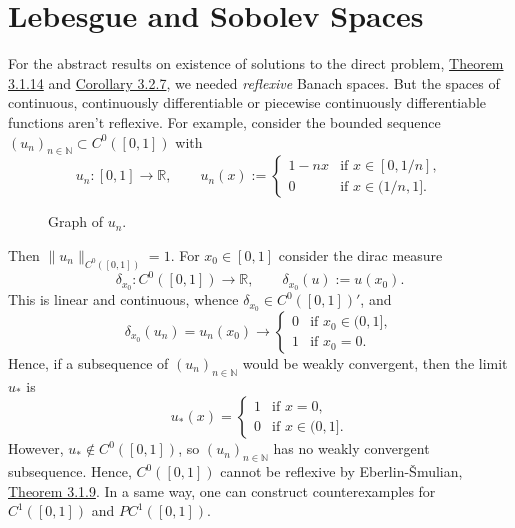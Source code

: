 \section{Lebesgue and Sobolev Spaces}
For the abstract results on existence of solutions to the direct problem, \hyperlink{theorem_3_1_14}{Theorem 3.1.14} and \hyperlink{corollary_3_2_7}{Corollary 3.2.7}, we needed \textit{reflexive} Banach spaces. But the spaces of continuous, continuously differentiable or piecewise continuously differentiable functions aren't reflexive. For example, consider the bounded sequence $(u_n)_{n\in\mathbb{N}}\subset C^0([0,1])$ with
\[u_n:[0,1]\longrightarrow\mathbb{R},\qquad u_n(x):=\left\{\begin{array}{rl}
	1-nx&\text{if }x\in[0,1/n],\\
	0&\text{if }x\in(1/n,1].
\end{array}\right.\]

\begin{figure}[ht]
	\centering
	\caption{Graph of $u_n$.}
\end{figure}

Then $\lVert u_n\rVert_{C^0([0,1])}=1$. For $x_0\in[0,1]$ consider the dirac measure
\[\delta_{x_0}:C^0([0,1])\longrightarrow\mathbb{R},\qquad\delta_{x_0}(u):=u(x_0).\]
This is linear and continuous, whence $\delta_{x_0}\in C^0([0,1])'$, and
\[\delta_{x_0}(u_n)=u_n(x_0)\to\left\{\begin{array}{rl}
	0&\text{if }x_0\in(0,1],\\
	1&\text{if }x_0=0.
\end{array}\right.\]
Hence, if a subsequence of $(u_n)_{n\in\mathbb{N}}$ would be weakly convergent, then the limit $u_*$ is
\[u_*(x)=\left\{\begin{array}{rl}
	1&\text{if }x=0,\\
	0&\text{if }x\in(0,1].
\end{array}\right.\]
However, $u_*\notin C^0([0,1])$, so $(u_n)_{n\in\mathbb{N}}$ has no weakly convergent subsequence. Hence, $C^0([0,1])$ cannot be reflexive by Eberlin-\v{S}mulian, \hyperlink{theorem_3_1_9}{Theorem 3.1.9}. In a same way, one can construct counterexamples for $C^1([0,1])$ and $PC^1([0,1])$.\\[33pt]


